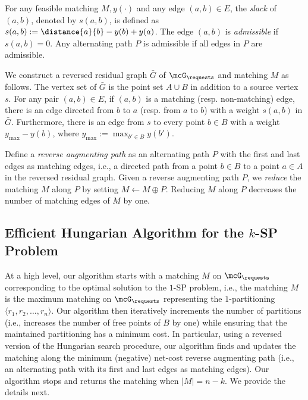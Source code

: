 For any feasible matching $M, y(\cdot)$ and any edge $(a,b)\in E$, the \emph{slack} of $(a,b)$, denoted by $s(a,b)$, is defined as $s(a,b):=\distance{a}{b} - y(b) + y(a)$. The edge $(a,b)$ is \emph{admissible} if $s(a,b)=0$. Any alternating path $P$ is admissible if all edges in $P$ are admissible. 


 We construct a reversed residual graph $\bar{G}$ of $\mcG_\requests$ and matching $M$ as follows. The vertex set of $\bar{G}$ is the point set $A\cup B$ in addition to a source vertex $s$. For any pair $(a,b)\in E$, if $(a,b)$ is a matching (resp. non-matching) edge, there is an edge directed from $b$ to $a$ (resp. from $a$ to $b$) with a weight $s(a,b)$ in $\bar{G}$. Furthermore, there is an edge from $s$ to every point $b\in B$ with a weight $y_{\max} - y(b)$, where $y_{\max}:=\max_{b'\in B} y(b')$. 

Define a \emph{reverse augmenting path} as an alternating path $P$ with the first and last edges as matching edges, i.e., a directed path from a point $b\in B$ to a point $a\in A$ in the reversed residual graph. Given a reverse augmenting path $P$, we \emph{reduce} the matching $M$ along $P$ by setting $M\leftarrow M\oplus P$. Reducing $M$ along $P$ decreases the number of matching edges of $M$ by one.


\subsection{Efficient Hungarian Algorithm for the \texorpdfstring{$k$}{}-SP Problem}\label{sec:hungarian_n2k_ksp}

At a high level, our algorithm starts with a matching $M$ on $\mcG_\requests$ corresponding to the optimal solution to the $1$-SP problem, i.e., the matching $M$ is the maximum matching on $\mcG_\requests$ representing the $1$-partitioning $\langle r_1, r_2,\ldots, r_n\rangle$. Our algorithm then iteratively increments the number of partitions (i.e., increases the number of free points of $B$ by one) while ensuring that the maintained partitioning has a minimum cost. In particular, using a reversed version of the Hungarian search procedure, our algorithm finds and updates the matching along the minimum (negative) net-cost reverse augmenting path (i.e., an alternating path with its first and last edges as matching edges). Our algorithm stops and returns the matching when $|M|=n-k$. We provide the details next.


